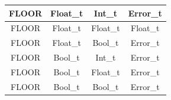 \begin{figure}[H]
\begin{tabular}{cccc}
        \midrule FLOOR & Float\_t & Int\_t    & Error\_t \\
        \midrule FLOOR & Float\_t & Float\_t  & Float\_t \\
        \midrule FLOOR & Float\_t & Bool\_t   & Error\_t \\

        \midrule FLOOR & Bool\_t & Int\_t     & Error\_t \\
        \midrule FLOOR & Bool\_t & Float\_t   & Error\_t \\
        \midrule FLOOR & Bool\_t & Bool\_t    & Error\_t \\

        \bottomrule
    \end{tabular}\\
\end{figure}

\newpage

